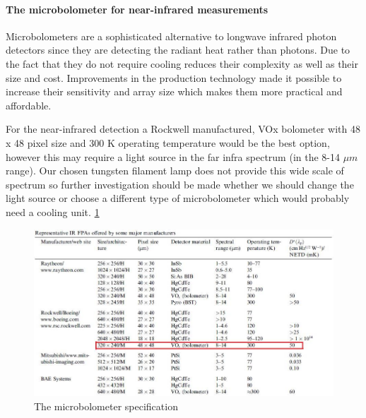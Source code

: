 \paragraph{The microbolometer for near-infrared measurements}
Microbolometers are a sophisticated alternative to longwave infrared photon detectors since they are detecting the radiant heat rather than photons. Due to the fact that they do not require cooling reduces their complexity as well as their size and cost. Improvements in the production technology made it possible to increase their sensitivity and array size which makes them more practical and affordable.

For the near-infrared detection a Rockwell manufactured, VOx bolometer with 48 x 48 pixel size and 300 K operating temperature would be the best option, however this may require a light source in the far infra spectrum (in the 8-14 $\mu m$ range). Our chosen tungsten filament lamp does not provide this wide scale of spectrum so further investigation should be made whether we should change the light source or choose a different type of microbolometer which would probably need a cooling unit. 
\ref{fig:Microbolometer}

\begin{figure}[htb]
  \centering
  \includegraphics[scale=0.6]{figures/BFfig/Microbolometer}
  \caption{The microbolometer specification \cite{Rogalski2002187}}
  \label{fig:Microbolometer}
\end{figure}




















